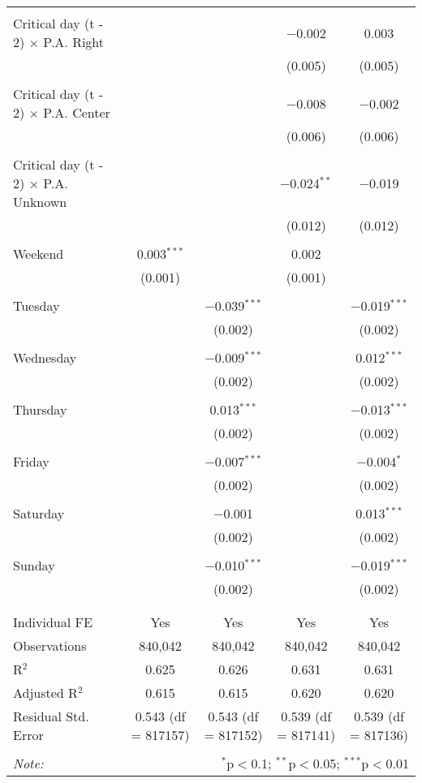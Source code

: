 \documentclass[
]{article}
\begin{document}
\begin{table}[!htbp]
{\begin{tabular}{@{\extracolsep{5pt}}lcccc}
  & & & & \\ 
 Critical day (t - 2) $\times$ P.A. Right &  &  & $-$0.002 & 0.003 \\ 
  &  &  & (0.005) & (0.005) \\ 
  & & & & \\ 
 Critical day (t - 2) $\times$ P.A. Center &  &  & $-$0.008 & $-$0.002 \\ 
  &  &  & (0.006) & (0.006) \\ 
  & & & & \\ 
 Critical day (t - 2) $\times$ P.A. Unknown &  &  & $-$0.024$^{**}$ & $-$0.019 \\ 
  &  &  & (0.012) & (0.012) \\ 
  & & & & \\ 
 Weekend & 0.003$^{***}$ &  & 0.002 &  \\ 
  & (0.001) &  & (0.001) &  \\ 
  & & & & \\ 
 Tuesday &  & $-$0.039$^{***}$ &  & $-$0.019$^{***}$ \\ 
  &  & (0.002) &  & (0.002) \\ 
  & & & & \\ 
 Wednesday &  & $-$0.009$^{***}$ &  & 0.012$^{***}$ \\ 
  &  & (0.002) &  & (0.002) \\ 
  & & & & \\ 
 Thursday &  & 0.013$^{***}$ &  & $-$0.013$^{***}$ \\ 
  &  & (0.002) &  & (0.002) \\ 
  & & & & \\ 
 Friday &  & $-$0.007$^{***}$ &  & $-$0.004$^{*}$ \\ 
  &  & (0.002) &  & (0.002) \\ 
  & & & & \\ 
 Saturday &  & $-$0.001 &  & 0.013$^{***}$ \\ 
  &  & (0.002) &  & (0.002) \\ 
  & & & & \\ 
 Sunday &  & $-$0.010$^{***}$ &  & $-$0.019$^{***}$ \\ 
  &  & (0.002) &  & (0.002) \\ 
  & & & & \\ 
\hline \\[-1.8ex] 
Individual FE & Yes & Yes & Yes & Yes \\ 
Observations & 840,042 & 840,042 & 840,042 & 840,042 \\ 
R$^{2}$ & 0.625 & 0.626 & 0.631 & 0.631 \\ 
Adjusted R$^{2}$ & 0.615 & 0.615 & 0.620 & 0.620 \\ 
Residual Std. Error & 0.543 (df = 817157) & 0.543 (df = 817152) & 0.539 (df = 817141) & 0.539 (df = 817136) \\ 
\hline 
\hline \\[-1.8ex] 
\textit{Note:}  & \multicolumn{4}{r}{$^{*}$p$<$0.1; $^{**}$p$<$0.05; $^{***}$p$<$0.01} \\ 
\end{tabular}
} 
\end{table} 
\newpage
\end{document}

